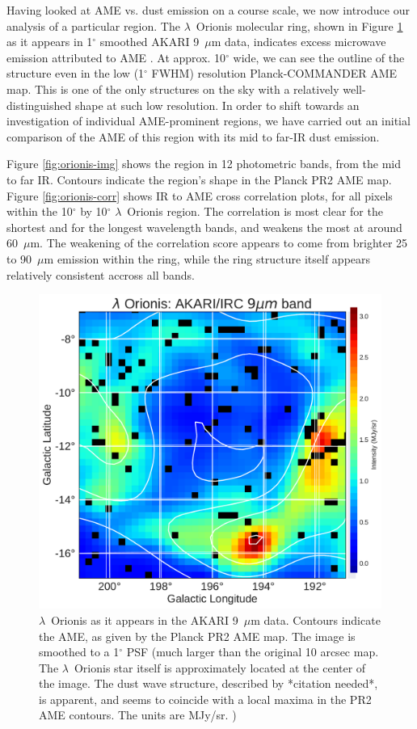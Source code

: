 \documentclass[preprint2,longabstract]{aastex}
\begin{document}
	Having looked at AME vs. dust emission on a course scale, we now introduce our analysis of a particular region. The $\lambda$~Orionis molecular ring, shown in Figure \ref{fig:orionis-akari9} as it appears in 1$^{\circ}$ smoothed AKARI 9~$\mu$m data, indicates excess microwave emission attributed to AME \citep{planck15XXV}. At approx. 10$^{\circ}$ wide, we can see the outline of the structure even in the low (1$^{\circ}$ FWHM) resolution Planck-COMMANDER AME map. This is one of the only structures on the sky with a relatively well-distinguished shape at such low resolution. In order to shift towards an investigation of individual AME-prominent regions, we have carried out an initial comparison of the AME of this region with its mid to far-IR dust emission.

	Figure \ref{fig:orionis-img} shows the region in 12 photometric bands, from the mid to far IR. Contours indicate the region's shape in the Planck PR2 AME map. Figure \ref{fig:orionis-corr} shows IR to AME cross correlation plots, for all pixels within the 10$^{\circ}$ by 10$^{\circ}$ $\lambda$~Orionis region. The correlation is most clear for the shortest and for the longest wavelength bands, and weakens the most at around 60~$\mu$m. The weakening of the correlation score appears to come from brighter 25 to 90~$\mu$m emission within the ring, while the ring structure itself appears relatively consistent accross all bands.

\begin{figure}
  \label{fig:orionis-akari9}
  \includegraphics[width=150mm]{../Plots/LOri_akari9_AMEcont_1dres.pdf}
  \centering
  \caption{$\lambda$~Orionis as it appears in the AKARI 9~$\mu$m data. Contours indicate the AME, as given by the Planck PR2 AME map. The image is smoothed to a 1$^{\circ}$ PSF (much larger than the original 10 arcsec map. The $\lambda$~Orionis star itself is approximately located at the center of the image. The dust wave structure, described by *citation needed*, is apparent, and seems to coincide with a local maxima in the PR2 AME contours. The units are MJy/sr. )}
\end{figure}
\end{document}
